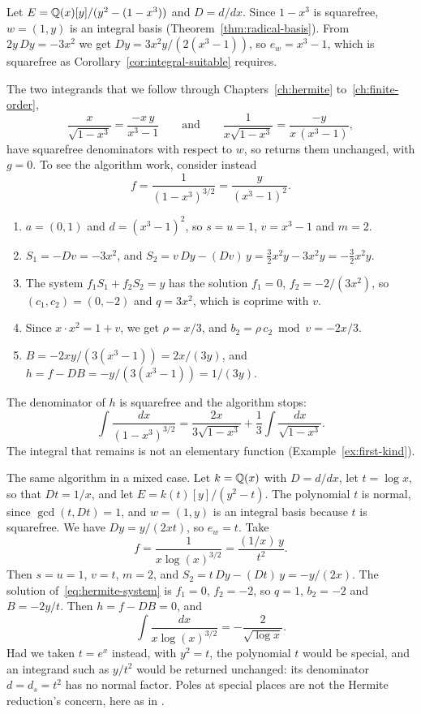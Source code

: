 \begin{example}\label{ex:running-hermite}
Let $E = \mathbb{Q}(x)[y]/(y^2 - (1 - x^3))$ and $D = d/dx$. Since $1 - x^3$ is
squarefree, $w = (1, y)$ is an integral basis (Theorem~\ref{thm:radical-basis}).
From $2 y\, Dy = -3x^2$ we get $Dy = 3x^2 y / (2 (x^3 - 1))$, so $e_w = x^3 -
1$, which is squarefree as Corollary~\ref{cor:integral-suitable} requires.

The two integrands that we follow through Chapters~\ref{ch:hermite}
to~\ref{ch:finite-order},
\[
  \frac{x}{\sqrt{1 - x^3}} = \frac{-x\, y}{x^3 - 1}
  \qquad\text{and}\qquad
  \frac{1}{x \sqrt{1 - x^3}} = \frac{-y}{x\,(x^3 - 1)},
\]
have squarefree denominators with respect to $w$, so 
returns them unchanged, with $g = 0$. To see the algorithm work, consider
instead
\[
  f = \frac{1}{(1 - x^3)^{3/2}} = \frac{y}{(x^3 - 1)^2} .
\]
\begin{enumerate}
\item $a = (0, 1)$ and $d = (x^3 - 1)^2$, so $s = u = 1$, $v = x^3 - 1$ and $m
  = 2$.
\item $S_1 = -Dv = -3x^2$, and $S_2 = v\, Dy - (Dv)\, y = \frac32 x^2 y - 3
  x^2 y = -\frac32 x^2 y$.
\item The system $f_1 S_1 + f_2 S_2 = y$ has the solution $f_1 = 0$, $f_2 =
  -2/(3x^2)$, so $(c_1, c_2) = (0, -2)$ and $q = 3x^2$, which is coprime
  with $v$.
\item Since $x \cdot x^2 = 1 + v$, we get $\rho = x/3$, and $b_2 = \rho\, c_2
  \bmod v = -2x/3$.
\item $B = -2 x y / (3 (x^3 - 1)) = 2x / (3y)$, and $h = f - DB = -y / (3
  (x^3 - 1)) = 1/(3y)$.
\end{enumerate}
The denominator of $h$ is squarefree and the algorithm stops:
\[
  \int \frac{dx}{(1 - x^3)^{3/2}}
  = \frac{2x}{3 \sqrt{1 - x^3}} + \frac13 \int \frac{dx}{\sqrt{1 - x^3}} .
\]
The integral that remains is not an elementary function
(Example~\ref{ex:first-kind}).
\end{example}

\begin{example}\label{ex:mixed-hermite}
The same algorithm in a mixed case. Let $k = \mathbb{Q}(x)$ with $D = d/dx$, let $t =
\log x$, so that $Dt = 1/x$, and let $E = k(t)[y]/(y^2 - t)$. The polynomial
$t$ is normal, since $\gcd(t, Dt) = 1$, and $w = (1, y)$ is an integral basis
because $t$ is squarefree. We have $Dy = y/(2xt)$, so $e_w = t$. Take
\[
  f = \frac{1}{x \log(x)^{3/2}} = \frac{(1/x)\, y}{t^2} .
\]
Then $s = u = 1$, $v = t$, $m = 2$, and $S_2 = t\, Dy - (Dt)\, y = -y/(2x)$.
The solution of~\eqref{eq:hermite-system} is $f_1 = 0$, $f_2 = -2$, so $q =
1$, $b_2 = -2$ and $B = -2y/t$. Then $h = f - DB = 0$, and
\[
  \int \frac{dx}{x \log(x)^{3/2}} = -\frac{2}{\sqrt{\log x}} .
\]
Had we taken $t = e^x$ instead, with $y^2 = t$, the polynomial $t$ would be
special, and an integrand such as $y / t^2$ would be returned unchanged: its
denominator $d = d_s = t^2$ has no normal factor. Poles at special places are
not the Hermite reduction's concern, here as in .
\end{example}

